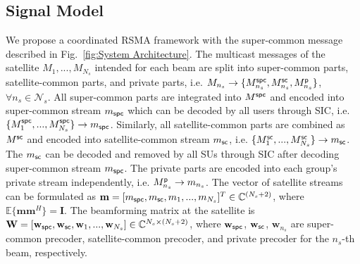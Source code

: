 \documentclass[draftclsnofoot, onecolumn, comsoc, 12pt]{IEEEtran}
\begin{document}
\subsection{Signal Model}
We propose a coordinated RSMA framework with the super-common message described in Fig.~\ref{fig:System Architecture}. 
The multicast messages of the satellite $M_{1},...,M_{N_{s}}$ intended for each beam are split into super-common parts, satellite-common parts, and private parts, i.e. $M_{n_{s}} \rightarrow \{M^{\sf{spc}}_{n_{s}}, M^{\sf{sc}}_{n_{s}}, M^{\sf{p}}_{n_{s}} \}$, $\forall n_{s} \in \mathcal{N}_{s}$. 
{All super-common parts are integrated into $M^{\sf{spc}}$ and encoded into super-common stream $m_{\sf{spc}}$ which can be decoded by all users through SIC, i.e. $\{M^{\sf{spc}}_{1},...,M^{\sf{spc}}_{N_{s}}\} \rightarrow m_{\sf{spc}}$.} 
Similarly, all satellite-common parts are combined as $M^{\sf{sc}}$ and encoded into satellite-common stream $m_{\sf{sc}}$, i.e. $\{M^{\sf{sc}}_{1},...,M^{\sf{sc}}_{N_{s}}\} \rightarrow m_{\sf{sc}}$. 
{The $m_{\sf{sc}}$ can be decoded and removed by all SUs through SIC after decoding super-common stream $m_{\sf{spc}}$.} 
The private parts are encoded into each group's private stream independently, i.e. $M^{\sf{p}}_{n_{s}} \rightarrow m_{n_{s}}$. The vector of satellite streams can be formulated as $\mathbf{m}=[m_{\sf{spc}},m_{\sf{sc}},m_{1},...,m_{N_{s}}]^{T}\in\mathbb{C}^{(N_{s}+2)}$, where $\mathbb{E}\{\mathbf{m}\mathbf{m}^{H}\}=\mathbf{I}$. 
The beamforming matrix at the satellite is $\mathbf{W} = [\mathbf{w}_{\sf{spc}},\mathbf{w}_{\sf{sc}},\mathbf{w}_{1},...,\mathbf{w}_{N_{s}}]\in\mathbb{C}^{N_{s}\times(N_{s}+2)}$, where $\mathbf{w}_{\sf{spc}}$, $\mathbf{w}_{\sf{sc}}$, $\mathbf{w}_{n_{s}}$ are super-common precoder, satellite-common precoder, and private precoder for the $n_{s}$-th beam, respectively. 
\end{document}
